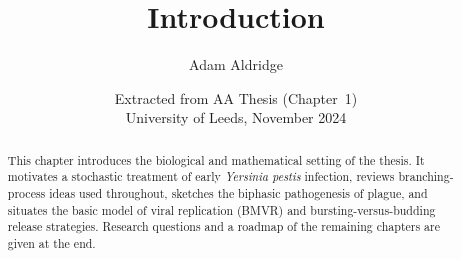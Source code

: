 \documentclass[11pt]{article}
\title{Introduction}
\author{Adam Aldridge}
\date{Extracted from AA Thesis (Chapter~1)\\University of Leeds, November 2024}
\theoremstyle{plain}
\theoremstyle{definition}
\theoremstyle{remark}
\begin{document}
\maketitle
\vspace{-1.5em}

\begin{abstract}
\noindent
This chapter introduces the biological and mathematical setting of the thesis.
It motivates a stochastic treatment of early \textit{Yersinia pestis} infection,
reviews branching-process ideas used throughout, sketches the biphasic
pathogenesis of plague, and situates the basic model of viral replication (BMVR)
and bursting-versus-budding release strategies. Research questions and a roadmap
of the remaining chapters are given at the end.
\end{abstract}

\tableofcontents
\clearpage











\FloatBarrier
\begingroup
\footnotesize


\endgroup
\end{document}

